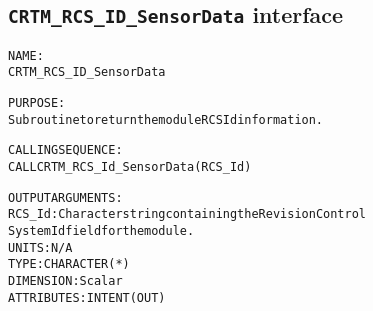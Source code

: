 \subsection{\texttt{CRTM\_RCS\_ID\_SensorData} interface}
  \label{sec:CRTM_RCS_ID_SensorData_interface}
  \begin{alltt}
 
  NAME:
        CRTM_RCS_ID_SensorData
 
  PURPOSE:
        Subroutine to return the module RCS Id information.
 
  CALLING SEQUENCE:
        CALL CRTM_RCS_Id_SensorData( RCS_Id )
 
  OUTPUT ARGUMENTS:
        RCS_Id:        Character string containing the Revision Control
                       System Id field for the module.
                       UNITS:      N/A
                       TYPE:       CHARACTER(*)
                       DIMENSION:  Scalar
                       ATTRIBUTES: INTENT(OUT)
 
  \end{alltt}

